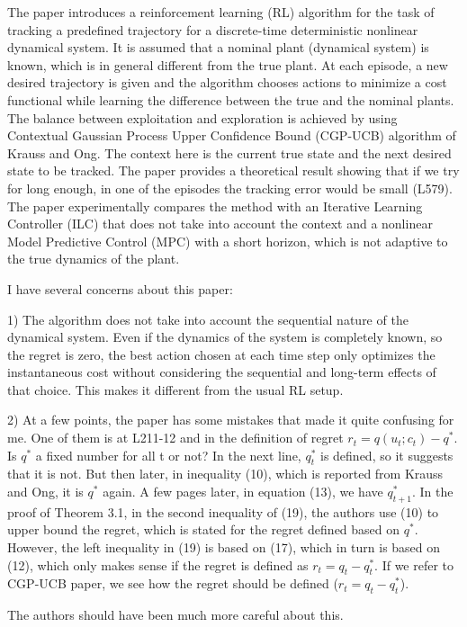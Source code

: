 \documentclass[10pt,a4paper]{article}
\begin{document}
The paper introduces a reinforcement learning (RL) algorithm for the task of tracking a predefined trajectory for a discrete-time deterministic nonlinear dynamical system.
It is assumed that a nominal plant (dynamical system) is known, which is in general different from the true plant. At each episode, a new desired trajectory is given and the algorithm chooses actions to minimize a cost functional while learning the difference between the true and the nominal plants.
The balance between exploitation and exploration is achieved by using Contextual Gaussian Process Upper Confidence Bound (CGP-UCB) algorithm of Krauss and Ong. The context here is the current true state and the next desired state to be tracked. The paper provides a theoretical result showing that if we try for long enough, in one of the episodes the tracking error would be small (L579). The paper experimentally compares the method with an Iterative Learning Controller (ILC) that does not take into account the context and a nonlinear Model Predictive Control (MPC) with a short horizon, which is not adaptive to the true dynamics of the plant.

I have several concerns about this paper:

1) The algorithm does not take into account the sequential nature of the dynamical system. Even if the dynamics of the system is completely known, so the regret is zero, the best action chosen at each time step only optimizes the instantaneous cost without considering the sequential and long-term effects of that choice. This makes it different from the usual RL setup.

2) At a few points, the paper has some mistakes that made it quite confusing for me. One of them is at L211-12 and in the definition of regret $r_t = q(u_t;c_t) - q^*$. Is $q^*$ a fixed number for all t or not? In the next line, $q^*_t$ is defined, so it suggests that it is not. But then later, in inequality (10), which is reported from Krauss and Ong, it is $q^*$ again. A few pages later, in equation (13), we have $q^*_{t+1}$. In the proof of Theorem 3.1, in the second inequality of (19), the authors use (10) to upper bound the regret, which is stated for the regret defined based on $q^*$. However, the left inequality in (19) is based on (17), which in turn is based on (12), which only makes sense if the regret is defined as $r_t = q_t - q^*_t$. If we refer to CGP-UCB paper, we see how the regret should be defined ($r_t = q_t - q^*_t$).

The authors should have been much more careful about this.
\end{document}
